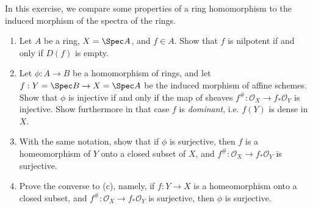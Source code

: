 \begin{exercise}%
	In this exercise, we compare some properties of a ring homomorphism to the induced morphism of the spectra of the rings.
	\begin{enumerate}
		\item Let $A $ be a ring, $X  = \Spec A$, and $f \in A $. Show that $f $ is nilpotent if and only if $D(f) $ is empty.
		\item Let $\phi :A\to B $ be a homomorphism of rings, and let $f: Y = \Spec B \to X = \Spec A $ be the induced morphism of affine schemes. Show that $\phi  $ is injective if and only if the map of sheaves $f^\#: \mathcal{O}_X \to f_\ast \mathcal{O}_Y $ is injective. Show furthermore in that case $f $ is \textit{dominant}, i.e. $f(Y) $ is dense in $X $.
		\item With the same notation, show that if $\phi  $ is surjective, then $f $ is a homeomorphism of $Y $ onto a closed subset of $X $, and $f^\#: \mathcal{O}_X\to f_\ast \mathcal{O}_Y$ is surjective.
		\item Prove the converse to (c), namely, if $f: Y\to X $ is a homeomorphism onto a closed subset, and $f^\#: \mathcal{O}_X\to f_\ast \mathcal{O}_Y $ is surjective, then $\phi  $ is surjective.
		\iffalse
			[Hint: Consider $X' = \Spec(A / \ker \phi)$ and use (b) and (c).]
		\fi
	\end{enumerate}
\end{exercise}
